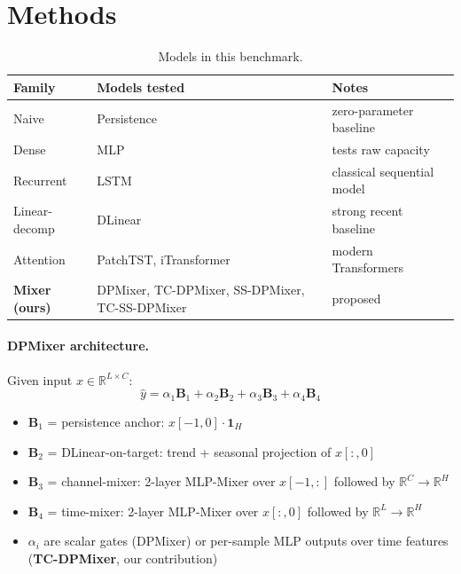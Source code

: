 \documentclass[11pt,letterpaper]{article}
\begin{document}
\section{Methods}

\begin{table}[H]
\centering
\small
\begin{tabular}{lll}
\toprule
\textbf{Family} & \textbf{Models tested} & \textbf{Notes} \\
\midrule
Naive            & Persistence                                                & zero-parameter baseline \\
Dense            & MLP                                                        & tests raw capacity \\
Recurrent        & LSTM                                                       & classical sequential model \\
Linear-decomp    & DLinear                                                    & strong recent baseline \\
Attention        & PatchTST, iTransformer                                     & modern Transformers \\
\textbf{Mixer (ours)} & DPMixer, TC-DPMixer, SS-DPMixer, TC-SS-DPMixer        & proposed \\
\bottomrule
\end{tabular}
\caption{Models in this benchmark.}
\end{table}

\paragraph{DPMixer architecture.} Given input $x \in \mathbb{R}^{L \times C}$:
\begin{equation}
\hat{y} = \alpha_1 \mathbf{B}_1 + \alpha_2 \mathbf{B}_2 + \alpha_3 \mathbf{B}_3 + \alpha_4 \mathbf{B}_4
\end{equation}
\begin{itemize}[leftmargin=*,itemsep=1pt]
  \item $\mathbf{B}_1$ = persistence anchor: $x[-1, 0] \cdot \mathbf{1}_H$
  \item $\mathbf{B}_2$ = DLinear-on-target: trend + seasonal projection of $x[:, 0]$
  \item $\mathbf{B}_3$ = channel-mixer: 2-layer MLP-Mixer over $x[-1, :]$ followed by $\mathbb{R}^C \to \mathbb{R}^H$
  \item $\mathbf{B}_4$ = time-mixer: 2-layer MLP-Mixer over $x[:, 0]$ followed by $\mathbb{R}^L \to \mathbb{R}^H$
  \item $\alpha_i$ are scalar gates (DPMixer) or per-sample MLP outputs over time features
        (\textbf{TC-DPMixer}, our contribution)
\end{itemize}
\end{document}
